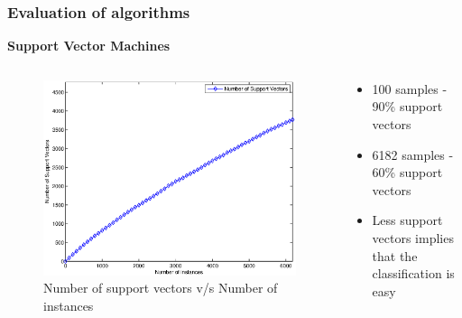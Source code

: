 \documentclass{beamer}
\begin{document}
    \begin{frame}
        \frametitle{Evaluation of algorithms}
        \begin{center}
            \textbf{Support Vector Machines}
        \end{center}
        \begin{columns}
            \begin{column}{0.5\textwidth}
                \begin{figure}
                    \centering
                    \includegraphics[width=\textwidth]{figures/svm_n_sv.eps}
                    \caption{Number of support vectors v/s Number of instances}
                \end{figure}
            \end{column}
            \begin{column}{0.5\textwidth}
                \begin{itemize}
                    \item{100 samples - 90\% support vectors}
                    \item{6182 samples - 60\% support vectors}
                    \item{Less support vectors implies that the classification is easy}
                \end{itemize}
            \end{column}
        \end{columns}
    \end{frame}
    
\end{document}
